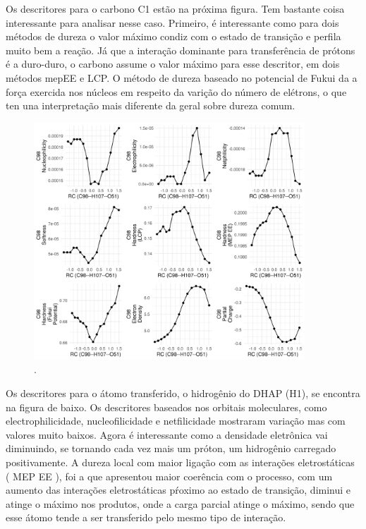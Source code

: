 \documentclass[a4paper,11pt]{refart}
\begin{document}
Os descritores para o carbono C1 estão na próxima figura. Tem bastante coisa interessante para analisar nesse caso. Primeiro, é interessante como para dois métodos de dureza o valor máximo condiz com o estado de transição e perfila muito bem a reação. Já que a interação dominante para transferência de prótons é a duro-duro, o carbono assume o valor máximo para esse descritor, em dois métodos mepEE e LCP. O método de dureza baseado no potencial de Fukui da a força exercida nos núcleos em respeito da varição do número de elétrons, o que ten una interpretação mais diferente da geral sobre dureza comum. 

\hspace*{-\leftmarginwidth}
\begin{minipage}{\fullwidth}
	\begin{figure}[H]
		\begin{center}
			\includegraphics[width=4in]{images/tut6_img4}
			\caption{.}
			\label{fig_tut6_3}
		\end{center}
	\end{figure}
\end{minipage}

Os descritores para o átomo transferido, o hidrogênio do DHAP (H1), se encontra na figura de baixo. Os descritores baseados nos orbitais moleculares, como electrophilicidade, nucleofilicidade e netfilicidade mostraram variação mas com valores muito baixos. Agora é interessante como a densidade eletrônica vai diminuindo, se tornando cada vez mais um próton, um hidrogênio carregado positivamente. A dureza local com maior ligação com as interações eletrostáticas ( MEP EE ), foi a que apresentou maior coerência com o processo, com um aumento das interações eletrostáticas pŕoximo ao estado de transição, diminui e atinge o máximo nos produtos, onde a carga parcial atinge o máximo, sendo que esse átomo tende a ser transferido pelo mesmo tipo de interação.
\end{document}

